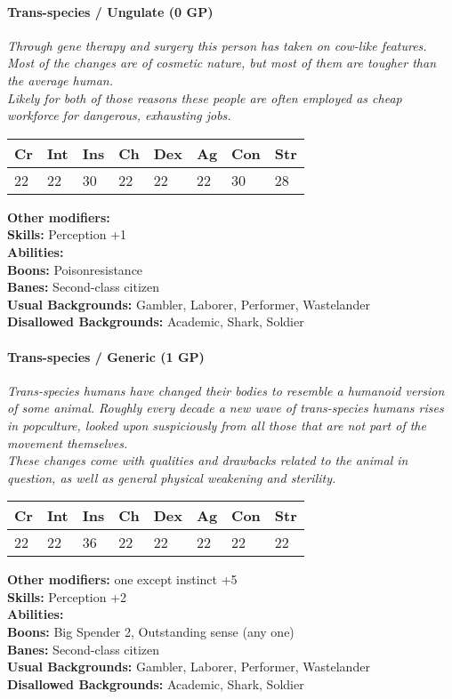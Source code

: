 \documentclass[12pt,a4paper,openany]{book}
\begin{document}
	\hrulefill
	\paragraph*{Trans-species / Ungulate (0 GP)}
	\textit{Through gene therapy and surgery this person has taken on cow-like features. Most of the changes are of cosmetic nature, but most of them are tougher than the average human.\\
	Likely for both of those reasons these people are often employed as cheap workforce for dangerous, exhausting jobs.}\par
	\begin{tabular}{|l|l|l|l|l|l|l|l|}
		\hline
		Cr & Int & Ins & Ch & Dex & Ag & Con & Str \\ \hline
		22 & 22 & 30 & 22 & 22 & 22 & 30 & 28 \\ \hline
	\end{tabular}\par
	\noindent\textbf{Other modifiers:} \\
	\textbf{Skills:} Perception +1\\
	\textbf{Abilities:} \\
	\textbf{Boons:} Poisonresistance\\
	\textbf{Banes:} Second-class citizen\\
	\textbf{Usual Backgrounds:} Gambler, Laborer, Performer, Wastelander\\
	\textbf{Disallowed Backgrounds:} Academic, Shark, Soldier
	
	\hrulefill
	\paragraph*{Trans-species / Generic (1 GP)}
	\textit{Trans-species humans have changed their bodies to resemble a humanoid version of some animal. Roughly every decade a new wave of trans-species humans rises in popculture, looked upon suspiciously from all those that are not part of the movement themselves.\\
	These changes come with qualities and drawbacks related to the animal in question, as well as general physical weakening and sterility.}\par
	\begin{tabular}{|l|l|l|l|l|l|l|l|}
		\hline
		Cr & Int & Ins & Ch & Dex & Ag & Con & Str \\ \hline
		22 & 22 & 36 & 22 & 22 & 22 & 22 & 22 \\ \hline
	\end{tabular}\par
	\noindent\textbf{Other modifiers:} one except instinct +5\\
	\textbf{Skills:} Perception +2\\
	\textbf{Abilities:} \\
	\textbf{Boons:} Big Spender 2, Outstanding sense (any one)\\
	\textbf{Banes:} Second-class citizen\\
	\textbf{Usual Backgrounds:} Gambler, Laborer, Performer, Wastelander\\
	\textbf{Disallowed Backgrounds:} Academic, Shark, Soldier
	
\end{document}
